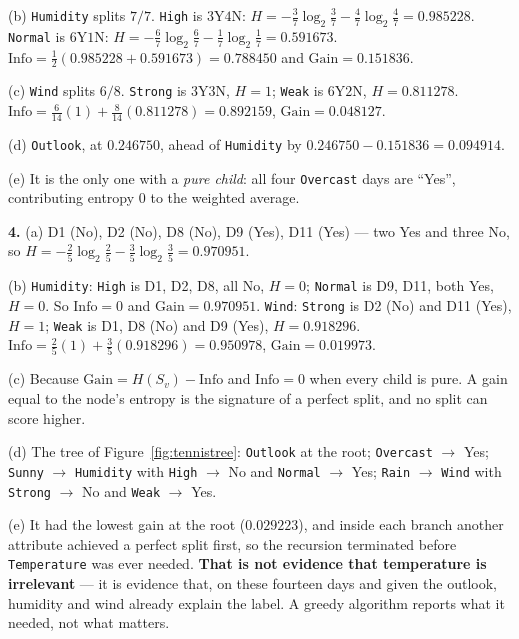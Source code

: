 \documentclass[11pt]{article}
\begin{document}
(b) \texttt{Humidity} splits $7/7$. \texttt{High} is $3$Y$4$N:
$H = -\tfrac37\log_2\tfrac37 - \tfrac47\log_2\tfrac47 = 0.985228$.
\texttt{Normal} is $6$Y$1$N:
$H = -\tfrac67\log_2\tfrac67 - \tfrac17\log_2\tfrac17 = 0.591673$.
$\mathrm{Info} = \tfrac12(0.985228 + 0.591673) = 0.788450$ and
$\mathrm{Gain} = \mathbf{0.151836}$.

(c) \texttt{Wind} splits $6/8$. \texttt{Strong} is $3$Y$3$N, $H = 1$;
\texttt{Weak} is $6$Y$2$N, $H = 0.811278$.
$\mathrm{Info} = \tfrac{6}{14}(1) + \tfrac{8}{14}(0.811278) = 0.892159$,
$\mathrm{Gain} = \mathbf{0.048127}$.

(d) \texttt{Outlook}, at $0.246750$, ahead of \texttt{Humidity} by
$0.246750 - 0.151836 = \mathbf{0.094914}$.

(e) It is the only one with a \emph{pure child}: all four \texttt{Overcast}
days are ``Yes'', contributing entropy $0$ to the weighted average.

\medskip
\textbf{4.} (a) D1 (No), D2 (No), D8 (No), D9 (Yes), D11 (Yes) --- two Yes and
three No, so
$H = -\tfrac25\log_2\tfrac25 - \tfrac35\log_2\tfrac35 = 0.970951$.

(b) \texttt{Humidity}: \texttt{High} is D1, D2, D8, all No, $H = 0$;
\texttt{Normal} is D9, D11, both Yes, $H = 0$. So $\mathrm{Info} = 0$ and
$\mathrm{Gain} = \mathbf{0.970951}$. \texttt{Wind}: \texttt{Strong} is D2 (No)
and D11 (Yes), $H = 1$; \texttt{Weak} is D1, D8 (No) and D9 (Yes),
$H = 0.918296$. $\mathrm{Info} = \tfrac25(1) + \tfrac35(0.918296) = 0.950978$,
$\mathrm{Gain} = 0.019973$.

(c) Because $\mathrm{Gain} = H(S_v) - \mathrm{Info}$ and $\mathrm{Info} = 0$
when every child is pure. A gain equal to the node's entropy is the signature
of a perfect split, and no split can score higher.

(d) The tree of Figure~\ref{fig:tennistree}: \texttt{Outlook} at the root;
\texttt{Overcast} $\to$ Yes; \texttt{Sunny} $\to$ \texttt{Humidity} with
\texttt{High} $\to$ No and \texttt{Normal} $\to$ Yes; \texttt{Rain} $\to$
\texttt{Wind} with \texttt{Strong} $\to$ No and \texttt{Weak} $\to$ Yes.

(e) It had the lowest gain at the root ($0.029223$), and inside each branch
another attribute achieved a perfect split first, so the recursion terminated
before \texttt{Temperature} was ever needed. \textbf{That is not evidence that
temperature is irrelevant} --- it is evidence that, on these fourteen days and
given the outlook, humidity and wind already explain the label. A greedy
algorithm reports what it needed, not what matters.
\end{document}
